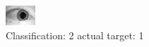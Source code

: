 \begin{figure}[h!]
\begin{center}
\includegraphics[width=0.60\columnwidth]{figures/ID1499_class_2_target_1.png}
\end{center}
\caption{ Classification: 2 actual target: 1}
\label{fig:ID1499_class_2_target_1}
\end{figure}
